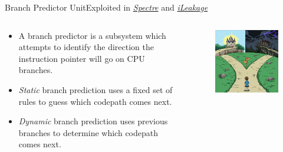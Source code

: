 \begin{frame}{Branch Predictor Unit}{Exploited in \hyperlink{spectre}
{{\color{pink}\textit{Spectre}}} and \href{https://ileakage.com/}{\color{pink}\textit{iLeakage}}}
    \begin{columns}
        \begin{column}{0.7\textwidth}
            \begin{itemize}
                \item   A branch predictor is a subsystem which attempts to identify the direction the instruction pointer will go on CPU branches.
                \item \textit{Static} branch prediction uses a fixed set of rules to guess which codepath comes next.
                \item \textit{Dynamic} branch prediction uses previous branches to determine which codepath comes next.
            \end{itemize}
        \end{column}
        \begin{column}{0.3\textwidth}
            \begin{figure}
                \centering
                \includegraphics[width=\textwidth]{images/two-paths.jpg}
                \label{fig:branch-predictor-meme}
            \end{figure}

\end{column}
\end{columns}
\end{frame}
